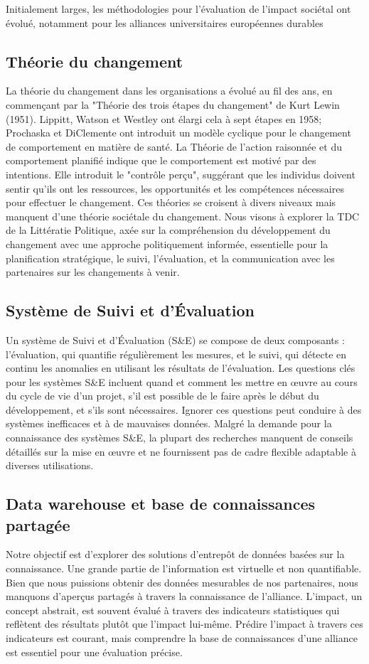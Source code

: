 Initialement larges, les méthodologies pour l'évaluation de l'impact sociétal ont évolué, notamment pour les alliances universitaires européennes durables

\subsection{Théorie du changement}
La théorie du changement dans les organisations a évolué au fil des ans, en commençant par la "Théorie des trois étapes du changement" de Kurt Lewin (1951). Lippitt, Watson et Westley ont élargi cela à sept étapes en 1958; Prochaska et DiClemente ont introduit un modèle cyclique pour le changement de comportement en matière de santé. La Théorie de l’action raisonnée et du comportement planifié indique que le comportement est motivé par des intentions. Elle introduit le "contrôle perçu", suggérant que les individus doivent sentir qu'ils ont les ressources, les opportunités et les compétences nécessaires pour effectuer le changement. Ces théories se croisent à divers niveaux mais manquent d'une théorie sociétale du changement. Nous visons à explorer la TDC de la Littératie Politique, axée sur la compréhension du développement du changement avec une approche politiquement informée, essentielle pour la planification stratégique, le suivi, l'évaluation, et la communication avec les partenaires sur les changements à venir.

\subsection{Système de Suivi et d'Évaluation }
Un système de Suivi et d'Évaluation (S\&E) se compose de deux composants : l'évaluation, qui quantifie régulièrement les mesures, et le suivi, qui détecte en continu les anomalies en utilisant les résultats de l'évaluation. Les questions clés pour les systèmes S\&E incluent quand et comment les mettre en œuvre au cours du cycle de vie d'un projet, s'il est possible de le faire après le début du développement, et s'ils sont nécessaires. Ignorer ces questions peut conduire à des systèmes inefficaces et à de mauvaises données. Malgré la demande pour la connaissance des systèmes S\&E, la plupart des recherches manquent de conseils détaillés sur la mise en œuvre et ne fournissent pas de cadre flexible adaptable à diverses utilisations.

\subsection{Data warehouse et base de connaissances partagée}
Notre objectif est d'explorer des solutions d'entrepôt de données basées sur la connaissance. Une grande partie de l'information est virtuelle et non quantifiable. Bien que nous puissions obtenir des données mesurables de nos partenaires, nous manquons d'aperçus partagés à travers la connaissance de l'alliance. L'impact, un concept abstrait, est souvent évalué à travers des indicateurs statistiques qui reflètent des résultats plutôt que l'impact lui-même. Prédire l'impact à travers ces indicateurs est courant, mais comprendre la base de connaissances d'une alliance est essentiel pour une évaluation précise. 